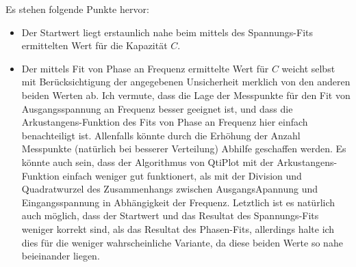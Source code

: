 Es stehen folgende Punkte hervor:
\begin{itemize}
    \item
        Der Startwert  liegt erstaunlich nahe beim  mittels des Spannungs-Fits
        ermittelten Wert f\"ur die Kapazit\"at $C$.
    \item
        Der mittels Fit von Phase an Frequenz ermittelte Wert f\"ur $C$ weicht
        selbst  mit Ber\"ucksichtigung  der angegebenen  Unsicherheit merklich
        von  den anderen  beiden Werten  ab. Ich  vermute, dass  die Lage  der
        Messpunkte  f\"ur  den Fit  von  Ausgangsspannung  an Frequenz  besser
        geeignet ist,  und dass die  Arkustangens-Funktion des Fits  von Phase
        an   Frequenz  hier  einfach  benachteiligt  ist. Allenfalls  k\"onnte
        durch die  Erh\"ohung der Anzahl Messpunkte  (nat\"urlich bei besserer
        Verteilung) Abhilfe geschaffen werden.
        Es  k\"onnte auch  sein,  dass  der Algorithmus  von  QtiPlot mit  der
        Arkustangens-Funktion  einfach weniger  gut funktionert,  als mit  der
        Division und Quadratwurzel des Zusammenhangs zwischen AusgangsApannung
        und Eingangsspannung  in Abh\"angigkeit  der Frequenz.
        Letztlich  ist  es  nat\"urlich  auch m\"oglich,  dass  der  Startwert
        und  das Resultat  des Spannungs-Fits  weniger korrekt  sind, als  das
        Resultat des Phasen-Fits, allerdings halte  ich dies f\"ur die weniger
        wahrscheinliche Variante,  da diese  beiden Werte so  nahe beieinander
        liegen.
\end{itemize}


